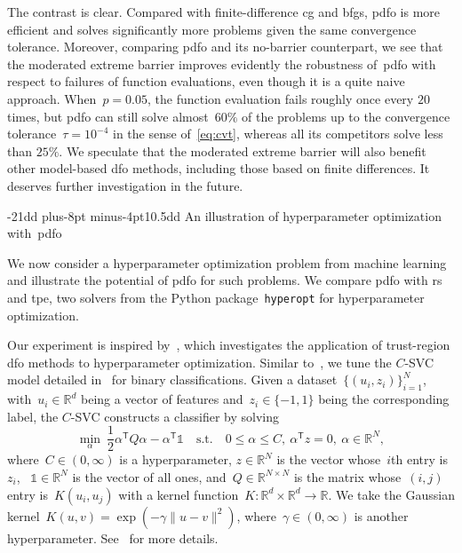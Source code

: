 \documentclass[
    smallextended,  %
    final,          %
]{svjour3}
\makeatletter
\newcommand{\trs}{{\scriptscriptstyle{\mathsf{T}}}}
\newcommand{\sn}{{\scriptscriptstyle{N}}}
\newcommand{\ones}{\mathbb{1}}
\newcommand{\R}{\mathbb{R}}
\newcommand{\norm}[2][]{#1\lVert#2#1\rVert}
\newcommand{\st}{\text{s.t.}}
\def\subsection{\@startsection{subsection}{2}{\z@}%
    {-21dd plus-8pt minus-4pt}{10.5dd}
     {\normalsize\bfseries}}
\makeatother
\begin{document}
The contrast is clear.
Compared with finite-difference \gls{cg} and \gls{bfgs}, \gls{pdfo} is
more efficient and solves significantly more problems given the same convergence tolerance.
Moreover, comparing \gls{pdfo} and its no-barrier counterpart, we see that the moderated extreme barrier
improves evidently the robustness of~\gls{pdfo} with respect to failures of function evaluations,
even though it is a quite naive approach.
When~$p = 0.05$, the function evaluation fails roughly once every $20$ times,
but \gls{pdfo} can still solve almost~$60\%$ of the problems up to the convergence
tolerance~$\tau = 10^{-4}$ in the sense of~\eqref{eq:cvt}, whereas all its competitors solve less than $25\%$.
We speculate that the moderated extreme barrier will also benefit other model-based \gls{dfo} methods,
including those based on finite differences. It deserves further investigation in the future.


\subsection{An illustration of hyperparameter optimization with~\gls{pdfo}}
\label{ssec:hypertune}

We now consider a hyperparameter optimization problem from machine learning and illustrate the potential
of \gls{pdfo} for such problems.
We compare \gls{pdfo} with \gls{rs} and \gls{tpe}, two solvers
from the Python package~\texttt{hyperopt} for hyperparameter optimization.

Our experiment is inspired by~\cite[\S~5.3]{Ghanbari_Scheinberg_2017}, which investigates the
application of trust-region \gls{dfo} methods to hyperparameter optimization.
Similar to~\mbox{\cite[\S~5.3]{Ghanbari_Scheinberg_2017}},
we tune the $C$-SVC model detailed in~\cite[\S~2.1]{Chang_Lin_2011} for binary classifications.
Given a dataset~$\{(u_i,z_i)\}_{i=1}^\sn$, with~$u_i \in \R^d$ being a vector of features
and~$z_i \in \{-1,1\}$ being the corresponding label,
the $C$-SVC constructs a classifier by solving
\begin{equation}
    \label{eq:svc}
        \min_{\alpha} ~ \frac{1}{2} \alpha^\trs Q \alpha - \alpha^\trs \ones
        \quad \st \quad 0 \leq \alpha \leq C, ~ \alpha^\trs z = 0, ~\alpha \in\R^{\sn},
\end{equation}
where~$C\in(0,\infty)$ is a hyperparameter, $z\in\R^{\sn}$ is the vector whose~$i$th entry is~$z_i$,
~$\ones\in\R^\sn$
is the vector of all ones, and~$Q\in\R^{\sn\times \sn}$ is the matrix whose~$(i,j)$ entry is~$K(u_i,u_j)$
with a kernel function~$K\mathrel{:} \R^{d}\times\R^{d} \to \R$.
We take the Gaussian kernel~$K(u,v) = \exp(-\gamma\norm{u-v}^2)$, where~$\gamma \in (0,\infty)$ is
another hyperparameter.
See~\cite[\S~2.1]{Chang_Lin_2011} for more details.
\end{document}
